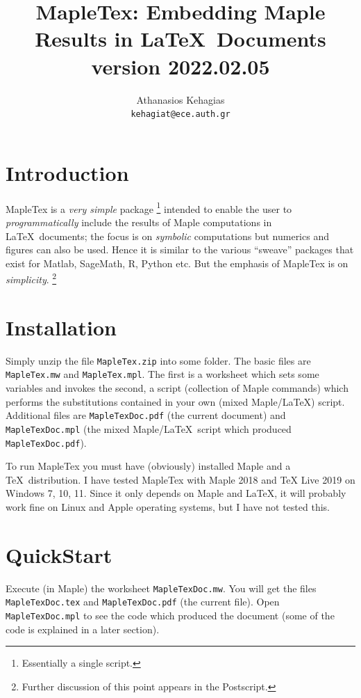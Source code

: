\documentclass{article}
\title{\textsf{MapleTex}: Embedding \textsf{Maple} Results in \LaTeX\ Documents\\ {\small version 2022.02.05}}
\author{Athanasios Kehagias\\ \texttt{kehagiat@ece.auth.gr}}
\begin{document}
 \maketitle
 \section{Introduction}
 \textsf{MapleTex} is a \emph{very simple} package
 \footnote{Essentially a single script.}
 intended to enable the user to \emph{programmatically} 
 include the results of \textsf{Maple} computations in \LaTeX\  documents;
 the focus is on \emph{symbolic} computations but numerics and figures can also be used. 
 Hence it is similar to the various ``sweave'' packages that exist for \textsf{Matlab},
 \textsf{SageMath}, \textsf{R}, \textsf{Python} etc. But the emphasis of \textsf{MapleTex} 
 is on \emph{simplicity}.
 \footnote{Further discussion of this point appears in the Postscript.}
 
 \section{Installation}
 Simply unzip the file \texttt{MapleTex.zip} into some folder. 
 The basic files are \texttt{MapleTex.mw} and \texttt{MapleTex.mpl}. The first is a worksheet which 
 sets some variables and invokes the second, a script (collection of \textsf{Maple} commands) 
 which performs the substitutions contained in your own (mixed \textsf{Maple}/\LaTeX) script.
 Additional files are \texttt{MapleTexDoc.pdf} (the current document) and \texttt{MapleTexDoc.mpl} 
 (the mixed \textsf{Maple}/\LaTeX\  script which produced \texttt{MapleTexDoc.pdf}). 
  
 To run \textsf{MapleTex} you must have (obviously) installed \textsf{Maple} and a \TeX\  distribution. 
 I have tested \textsf{MapleTex} with \textsf{Maple 2018} and \textsf{TeX Live 2019} on
 \textsf{Windows 7, 10, 11}. Since it only depends on \textsf{Maple} and \LaTeX,
 it will probably work fine on \textsf{Linux} and \textsf{Apple} operating systems,
 but I have not tested this. 
 
 \section{QuickStart}
 Execute (in \textsf{Maple}) the worksheet \texttt{MapleTexDoc.mw}. You will get the files \texttt{MapleTexDoc.tex} 
 and \texttt{MapleTexDoc.pdf} (the current file).
 Open \texttt{MapleTexDoc.mpl}  to see the code which produced the document
 (some of the code is explained in a later section). 
 
\end{document}
